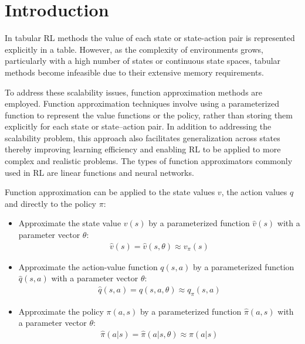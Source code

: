 \section{Introduction}

In tabular RL methods the value of each state or state-action pair is represented explicitly in a table. However, as the complexity of environments grows, particularly with a high number of states or continuous state spaces, tabular methods become infeasible due to their extensive memory requirements. 

To address these scalability issues, function approximation methods are employed. Function approximation techniques involve using a parameterized function to represent the value functions or the policy, rather than storing them explicitly for each state or state--action pair. In addition to addressing the scalability problem, this approach also facilitates generalization across states thereby improving learning efficiency and enabling RL to be applied to more complex and realistic problems. The types of function approximators commonly used in RL are linear functions and neural networks. 

Function approximation can be applied to the state values $v$, the action values $q$ and directly to the policy $\pi$:
\begin{itemize}
\item Approximate the state value $v(s)$ by a parameterized function $\hat{v}(s)$ with a parameter vector $\theta$:\\
\begin{align*}
\hat{v}(s) = \hat{v}(s, \theta) \approx v_{\pi}(s)
\end{align*}
\item Approximate the action-value function $q(s, a)$ by a parameterized function $\hat{q}(s, a)$ with a parameter vector $\theta$:
\begin{align*}
\hat{q}(s, a) = \hat{q}(s, a, \theta) \approx q_{\pi}(s, a)
\end{align*}
\item Approximate the policy $\pi(a, s)$ by a parameterized function $\hat{\pi}(a, s)$ with a parameter vector $\theta$:
\begin{align*}
\hat{\pi}(a | s) = \hat{\pi}(a | s, \theta) \approx \pi(a | s)
\end{align*}
\end{itemize}

